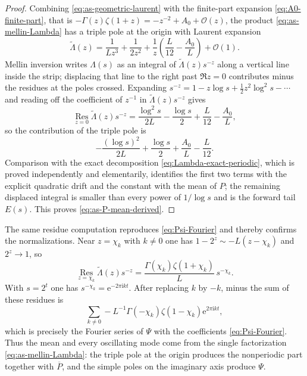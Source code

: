 \documentclass[11pt,oneside]{article}
\theoremstyle{definition}
\theoremstyle{remark}
\newcommand{\e}{\mathrm e}
\newcommand{\ii}{\mathrm i}
\newcommand{\bigO}{\mathcal O}
\begin{document}
\begin{proof}
Combining \eqref{eq:as-geometric-laurent} with the finite-part expansion
\eqref{eq:A0-finite-part}, that is $-\Gamma(z)\zeta(1+z)=-z^{-2}+A_0+\bigO(z)$, the product
\eqref{eq:as-mellin-Lambda} has a triple pole at the origin with Laurent expansion
\begin{equation}
 \widetilde\Lambda(z)=\frac{1}{Lz^{3}}+\frac{1}{2z^{2}}
 +\frac1z\left(\frac{L}{12}-\frac{A_0}{L}\right)+\bigO(1). \label{eq:as-Lambda-laurent}
\end{equation}
Mellin inversion writes $\Lambda(s)$ as an integral of $\widetilde\Lambda(z)s^{-z}$ along a
vertical line inside the strip; displacing that line to the right past $\Re z=0$ contributes
minus the residues at the poles crossed.  Expanding
$s^{-z}=1-z\log s+\tfrac12z^{2}\log^{2}s-\cdots$ and reading off the coefficient of $z^{-1}$
in $\widetilde\Lambda(z)s^{-z}$ gives
\begin{equation*}
 \operatorname*{Res}_{z=0}\widetilde\Lambda(z)s^{-z}
 =\frac{\log^{2}s}{2L}-\frac{\log s}{2}+\frac{L}{12}-\frac{A_0}{L},
\end{equation*}
so the contribution of the triple pole is
\begin{equation*}
 -\frac{(\log s)^{2}}{2L}+\frac{\log s}{2}+\frac{A_0}{L}-\frac{L}{12}.
\end{equation*}
Comparison with the exact decomposition \eqref{eq:Lambda-exact-periodic}, which is proved
independently and elementarily, identifies the first two terms with the explicit quadratic
drift and the constant with the mean of $P$; the remaining displaced integral is smaller than
every power of $1/\log s$ and is the forward tail $E(s)$.  This proves
\eqref{eq:as-P-mean-derived}.
\end{proof}

The same residue computation reproduces \eqref{eq:Psi-Fourier} and thereby confirms the
normalizations.  Near $z=\chi_k$ with $k\ne0$ one has $1-2^{z}\sim-L(z-\chi_k)$ and
$2^{z}\to1$, so
\begin{equation*}
 \operatorname*{Res}_{z=\chi_k}\widetilde\Lambda(z)s^{-z}
 =\frac{\Gamma(\chi_k)\zeta(1+\chi_k)}{L}\,s^{-\chi_k}.
\end{equation*}
With $s=2^{t}$ one has $s^{-\chi_k}=\e^{-2\pi\ii kt}$.  After replacing $k$ by $-k$, minus
the sum of these residues is
\[
 \sum_{k\ne0}-L^{-1}\Gamma(-\chi_k)\zeta(1-\chi_k)\e^{2\pi\ii kt},
\]
which is precisely the Fourier series of $\Psi$ with the coefficients
\eqref{eq:Psi-Fourier}.  Thus the mean and every oscillating mode come from the single
factorization \eqref{eq:as-mellin-Lambda}: the triple pole at the origin produces the
nonperiodic part together with $\overline P$, and the simple poles on the imaginary axis
produce $\Psi$.
\end{document}
